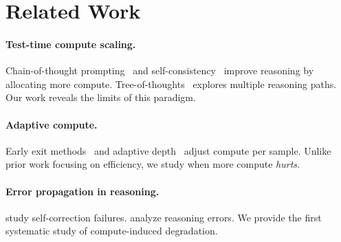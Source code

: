 \section{Related Work}

\paragraph{Test-time compute scaling.}
Chain-of-thought prompting~\cite{wei2022chain} and self-consistency~\cite{wang2022self} improve reasoning by allocating more compute.
Tree-of-thoughts~\cite{yao2024tree} explores multiple reasoning paths.
Our work reveals the limits of this paradigm.

\paragraph{Adaptive compute.}
Early exit methods~\cite{schuster2022confident} and adaptive depth~\cite{elbayad2020depth} adjust compute per sample.
Unlike prior work focusing on efficiency, we study when more compute \emph{hurts}.

\paragraph{Error propagation in reasoning.}
\citet{stechly2024self} study self-correction failures.
\citet{huang2023large} analyze reasoning errors.
We provide the first systematic study of compute-induced degradation.

